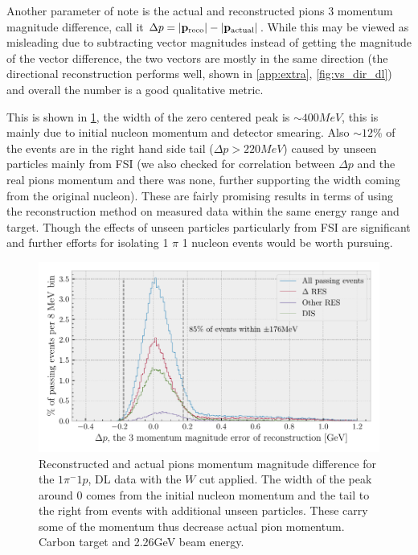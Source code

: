 \documentclass[a4paper,12pt]{article}
\newcommand{\md}{$1\pi^-1p$}
\begin{document}
Another parameter of note is the actual and reconstructed pions 3 momentum magnitude difference, call it $\Delta p = |\vb{p}_\text{reco}| - |\vb{p}_\text{actual}|$.
While this may be viewed as misleading due to subtracting vector magnitudes instead of getting the magnitude of the vector difference, the two vectors are mostly in the same direction (the directional reconstruction performs well, shown in \cref{app:extra}, \cref{fig:vs_dir_dl}) and overall the number is a good qualitative metric.

This is shown in \cref{fig:p_test_dl_W}, the width of the zero centered peak is $\sim 400\si{MeV}$, this is mainly due to initial nucleon momentum and detector smearing.
Also $\sim 12\%$ of the events are in the right hand side tail ($\Delta p > 220\si{MeV}$) caused by unseen particles mainly from FSI (we also checked for correlation between $\Delta p$ and the real pions momentum and there was none, further supporting the width coming from the original nucleon).
These are fairly promising results in terms of using the reconstruction method on measured data within the same energy range and target.
Though the effects of unseen particles particularly from FSI are significant and further efforts for isolating 1 $\pi$ 1 nucleon events would be worth pursuing.

\begin{figure}[H]
    \centering
    \includegraphics{figures/python/metr_m_dl_W.pdf}
    \caption{
        Reconstructed and actual pions momentum magnitude difference for the \md, DL data with the $W$ cut applied.
        The width of the peak around 0 comes from the initial nucleon momentum and the tail to the right from events with additional unseen particles.
        These carry some of the momentum thus decrease actual pion momentum.
        Carbon target and 2.26\si{GeV} beam energy.
    }\label{fig:p_test_dl_W}
\end{figure}
\end{document}
